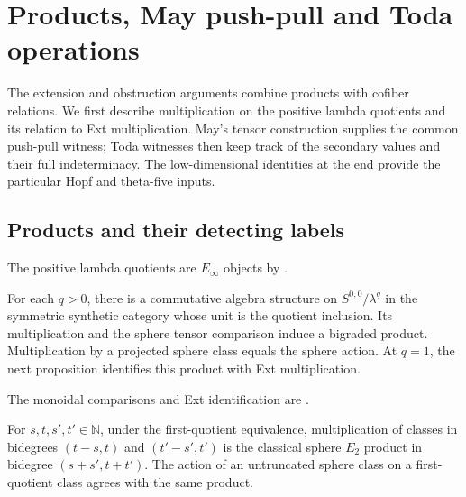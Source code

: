 \section{Products, May push-pull and Toda operations}
The extension and obstruction arguments combine products with cofiber
relations. We first describe multiplication on the positive lambda quotients
and its relation to Ext multiplication. May's tensor construction supplies
the common push-pull witness; Toda witnesses then keep track of the
secondary values and their full indeterminacy. The low-dimensional
identities at the end provide the particular Hopf and theta-five inputs.

\subsection{Products and their detecting labels}

\begin{proposition}
\label{sem:Literature:quotient-algebras}
The positive lambda quotients are $E_\infty$ objects by \cite[Remark 3.4]{LWX126}.\par

For each $q>0$, there is a commutative algebra structure on
$S^{0,0}/\lambda^q$ in the symmetric synthetic category whose unit
is the quotient inclusion. Its multiplication and the sphere tensor
comparison induce a bigraded product. Multiplication by a projected
sphere class equals the sphere action. At $q=1$, the next proposition
identifies this product with Ext multiplication.


\end{proposition}


\begin{proposition}
\label{sem:Literature:first-quotient-products}
The monoidal comparisons and Ext identification are \cite[Theorems 4.46 and 4.54, Lemma 4.56]{Pst}.\par

For $s,t,s',t'\in\mathbb N$, under the first-quotient equivalence, multiplication of classes in bidegrees $(t-s,t)$ and $(t'-s',t')$ is the classical sphere $E_2$ product in bidegree $(s+s',t+t')$. The action of an untruncated sphere class on a first-quotient class agrees with the same product.


\end{proposition}

